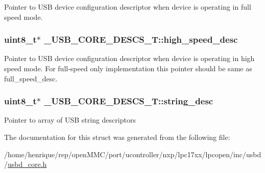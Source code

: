 Pointer to U\-S\-B device configuration descriptor when device is operating in full speed mode. \hypertarget{struct__USB__CORE__DESCS__T_a99f740c42483df30cc2924383c8a4d2b}{
\subsubsection[{high\-\_\-speed\-\_\-desc}]{\setlength{\rightskip}{0pt plus 5cm}uint8\-\_\-t$\ast$ \-\_\-\-U\-S\-B\-\_\-\-C\-O\-R\-E\-\_\-\-D\-E\-S\-C\-S\-\_\-\-T\-::high\-\_\-speed\-\_\-desc}}\label{struct__USB__CORE__DESCS__T_a99f740c42483df30cc2924383c8a4d2b}
Pointer to U\-S\-B device configuration descriptor when device is operating in high speed mode. For full-\/speed only implementation this pointer should be same as full\-\_\-speed\-\_\-desc. \hypertarget{struct__USB__CORE__DESCS__T_af785297629e79dec58480668d005c04e}{
\subsubsection[{string\-\_\-desc}]{\setlength{\rightskip}{0pt plus 5cm}uint8\-\_\-t$\ast$ \-\_\-\-U\-S\-B\-\_\-\-C\-O\-R\-E\-\_\-\-D\-E\-S\-C\-S\-\_\-\-T\-::string\-\_\-desc}}\label{struct__USB__CORE__DESCS__T_af785297629e79dec58480668d005c04e}
Pointer to array of U\-S\-B string descriptors 

The documentation for this struct was generated from the following file\-:\begin{DoxyCompactItemize}
\item 
/home/henrique/rep/open\-M\-M\-C/port/ucontroller/nxp/lpc17xx/lpcopen/inc/usbd/\hyperlink{usbd__core_8h}{usbd\-\_\-core.\-h}\end{DoxyCompactItemize}
